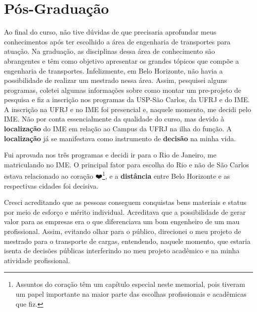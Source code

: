 \documentclass[
]{book}
\begin{document}
\hypertarget{puxf3s-graduauxe7uxe3o}{%
\section{Pós-Graduação}\label{puxf3s-graduauxe7uxe3o}}

Ao final do curso, não tive dúvidas de que precisaria aprofundar meus conhecimentos após ter escolhido a área de engenharia de transportes para atuação. Na graduação, as disciplinas dessa área de conhecimento são abrangentes e têm como objetivo apresentar os grandes tópicos que compõe a engenharia de transportes. Infelizmente, em Belo Horizonte, não havia a possibilidade de realizar um mestrado nessa área. Assim, pesquisei alguns programas, coletei algumas informações sobre como montar um pre-projeto de pesquisa e fiz a inscrição nos programas da USP-São Carlos, da UFRJ e do IME. A inscrição na UFRJ e no IME foi presencial e, naquele momento, me decidi pelo IME. Não por conta essencialmente da qualidade do curso, mas devido à \textbf{localização} do IME em relação ao Campus da UFRJ na ilha do função. A \textbf{localização} já se manifestava como instrumento de \textbf{decisão} na minha vida.

Fui aprovada nos três programas e decidi ir para o Rio de Janeiro, me matriculando no IME. O principal fator para escolha do Rio e não de São Carlos estava relacionado ao coração ❤️\footnote{Assuntos do coração têm um capítulo especial neste memorial, pois tiveram um papel importante na maior parte das escolhas profissionais e acadêmicas que fiz.}, e a \textbf{distância} entre Belo Horizonte e as respectivas cidades foi decisiva.

Cresci acreditando que as pessoas conseguem conquistas bens materiais e status por meio de esforço e mérito individual. Acreditava que a possibilidade de gerar valor para as empresas era o que diferenciava um bom engenheiro de um mau profissional. Assim, evitando olhar para o público, direcionei o meu projeto de mestrado para o transporte de cargas, entendendo, naquele momento, que estaria isenta de decisões públicas interferindo no meu projeto acadêmico e na minha atividade profissional.
\end{document}
